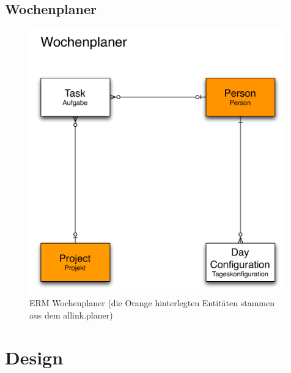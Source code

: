 \subsection{Wochenplaner}
\begin{figure}[!ht]
\begin{center}
\includegraphics[width=0.99\textwidth,angle=0]{./bilder/erm.pdf}
\caption[]{ERM Wochenplaner (die Orange hinterlegten Entitäten stammen aus dem allink.planer)\footnotemark}
\end{center}
\end{figure}

\section{Design}

